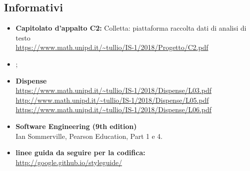 \subsection{Informativi}
\begin{itemize}
\item \textbf{Capitolato d’appalto C2:} Colletta: piattaforma raccolta dati di analisi di testo\\
\url{https://www.math.unipd.it/~tullio/IS-1/2018/Progetto/C2.pdf}
\item \textbf{\PdP};
\item \textbf{Dispense} \\
\url{https://www.math.unipd.it/~tullio/IS-1/2018/Dispense/L03.pdf}\\
\url{http://www.math.unipd.it/~tullio/IS-1/2018/Dispense/L05.pdf}\\
\url{https://www.math.unipd.it/~tullio/IS-1/2018/Dispense/L06.pdf}\\


\item \textbf{Software Engineering (9th edition)}\\ Ian Sommerville, Pearson Education, Part 1 e 4.
\item \textbf{linee guida da seguire per la codifica:} \\
\url{http://google.github.io/styleguide/}

\end{itemize}
